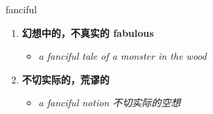 
\begin{frame}
{\huge fanciful}
\begin{center}
\begin{enumerate}\Large
  \item \textbf{幻想中的，不真实的 fabulous}
  \begin{itemize}
    \item \em{\Large{a fanciful tale of a monster in the wood}}
  \end{itemize}
  \item \textbf{不切实际的，荒谬的}
  \begin{itemize}
    \item \em{\Large{a fanciful notion 不切实际的空想}}
  \end{itemize}
\end{enumerate}
\end{center}
\end{frame}
